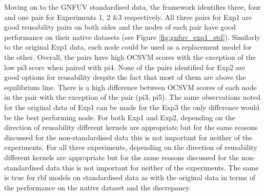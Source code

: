 \documentclass{mpaper}
\begin{document}
Moving on to the GNFUV standardised data, the framework identifies three, four and one pair for Experiments 1, 2 \&3 respectively. All three pairs for Exp1 are good reusability pairs on both sides and the nodes of each pair have good performance on their native datasets (see Figure \ref{fig:gnfuv_exp1_std}). Similarly to the original Exp1 data, each node could be used as a replacement model for the other. Overall, the pairs have high OCSVM scores with the exception of the low pi3 score when paired with pi4. None of the pairs identified for Exp2 are good options for reusability despite the fact that most of them are above the equilibrium line. There is a high difference between OCSVM scores of each node in the pair with the exception of the pair (pi3, pi5). The same observations noted for the original data of Exp1 can be made for the Exp3 the only difference would be the best performing node. For both Exp1 and Exp2, depending on the direction of reusability different kernels are appropriate but for the same reasons discussed for the non-standardised data this is not important for neither of the experiments. For all three experiments, depending on the direction of reusability different kernels are appropriate but for the same reasons discussed for the non-standardised data this is not important for neither of the experiments. The same is true for rbf models on standardised data as with the original data in terms of the performance on the native dataset and the discrepancy.
\end{document}
